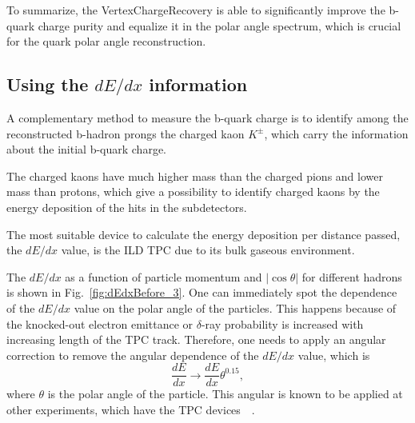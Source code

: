 To summarize, the VertexChargeRecovery is able to significantly improve the b-quark charge purity and equalize it in the polar angle spectrum, which is crucial for the quark polar angle reconstruction. 
\subsection{Using the $dE/dx$ information}

A complementary method to measure the b-quark charge is to identify among the reconstructed b-hadron prongs the charged kaon $K^\pm$, which carry the information about the initial b-quark charge. 

The charged kaons have much higher mass than the charged pions and lower mass than protons, which give a possibility to identify charged kaons by the energy deposition of the hits in the subdetectors. 

The most suitable device to calculate the energy deposition per distance passed, the $dE/dx$ value, is the ILD TPC due to its bulk gaseous environment. 


The $dE/dx$ as a function of particle momentum and $|\cos\theta|$ for different hadrons is shown in Fig.~\ref{fig:dEdxBefore_3}. One can immediately spot the dependence of the $dE/dx$ value on the polar angle of the particles. This happens because of the knocked-out electron emittance or $\delta$-ray probability is increased with increasing length of the TPC track. Therefore, one needs to apply an angular correction to remove the angular dependence of the $dE/dx$ value, which is 
\begin{equation}
	\frac{dE}{dx}\to\frac{dE}{dx}\theta^{0.15},
    \label{formula:dEdxCorrection}
\end{equation}
where $\theta$ is the polar angle of the particle. 
This angular is known to be applied at other experiments, which have the TPC devices~\cite{bib:HARP}~\cite{buskulic:in2p3-00002096}.

